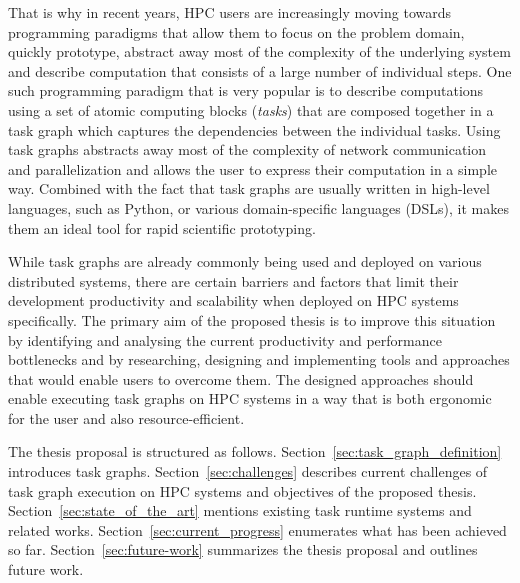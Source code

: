 That is why in recent years, HPC users are increasingly moving towards programming paradigms that
allow them to focus on the problem domain, quickly prototype, abstract away most of the complexity
of the underlying system and describe computation that consists of a large number of individual
steps. One such programming paradigm that is very popular is to describe computations
using a set of atomic computing blocks (\emph{tasks}) that are composed together in a task graph
which captures the dependencies between the individual tasks. Using task graphs abstracts away most
of the complexity of network communication and parallelization and allows the user to
express their computation in a simple way. Combined with the fact that
task graphs are usually written in high-level languages, such as Python, or various domain-specific
languages (DSLs), it makes them an ideal tool for rapid scientific prototyping.

While task graphs are already commonly being used and deployed on various distributed systems,
there are certain barriers and factors that limit their development productivity and scalability
when deployed on HPC systems specifically. The primary aim of the proposed thesis is to improve
this situation by identifying and analysing the current productivity and performance bottlenecks
and by researching, designing and implementing tools and approaches that would enable users to
overcome them. The designed approaches should enable executing task graphs on HPC systems in a
way that is both ergonomic for the user and also resource-efficient.

The thesis proposal is structured as follows. Section~\ref{sec:task_graph_definition} introduces
task graphs. Section~\ref{sec:challenges} describes current challenges of task graph execution on
HPC systems and objectives of the proposed thesis. Section~\ref{sec:state_of_the_art} mentions
existing task runtime systems and related works. Section~\ref{sec:current_progress} enumerates
what has been achieved so far. Section~\ref{sec:future-work} summarizes the thesis proposal and
outlines future work.
